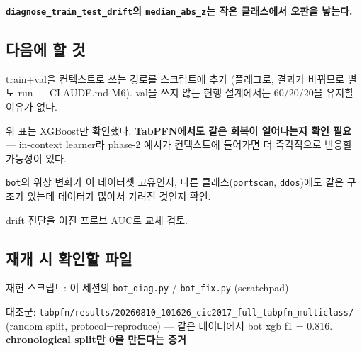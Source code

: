 \par\noindent \textbullet\enspace \textbf{\texttt{diagnose\allowbreak{}\_\allowbreak{}\allowbreak{}train\_\allowbreak{}\allowbreak{}t\allowbreak{}est\_\allowbreak{}\allowbreak{}drif\allowbreak{}t}의 \texttt{median\_\allowbreak{}\allowbreak{}a\allowbreak{}bs\_\allowbreak{}\allowbreak{}z}는 작은 클래스에서 오판을 낳는다.}


\subsection{다음에 할 것}
\par\noindent \textbullet\enspace [ ] train+\allowbreak{}val을 컨텍스트로 쓰는 경로를 스크립트에 추가 (플래그로, 결과가 바뀌므로 별도 run — CLAUDE.md M6). val을 쓰지 않는 현행 설계에서는 60/\allowbreak{}20/\allowbreak{}20을 유지할 이유가 없다.


\par\noindent \textbullet\enspace [ ] 위 표는 XGBoost만 확인했다. \textbf{TabPFN에서도 같은 회복이 일어나는지 확인 필요} — in-context learner라 phase-2 예시가 컨텍스트에 들어가면 더 즉각적으로 반응할 가능성이 있다.


\par\noindent \textbullet\enspace [ ] \texttt{bot}의 위상 변화가 이 데이터셋 고유인지, 다른 클래스(\texttt{portscan\allowbreak{}}, \texttt{ddos})에도 같은 구조가 있는데 데이터가 많아서 가려진 것인지 확인.


\par\noindent \textbullet\enspace [ ] drift 진단을 이진 프로브 AUC로 교체 검토.


\subsection{재개 시 확인할 파일}
\par\noindent \textbullet\enspace 재현 스크립트: 이 세션의 \texttt{bot\_\allowbreak{}\allowbreak{}diag\allowbreak{}.\allowbreak{}py} /\allowbreak{} \texttt{bot\_\allowbreak{}\allowbreak{}fix.\allowbreak{}py} (scratchpad)


\par\noindent \textbullet\enspace 대조군: \texttt{tabpfn/\allowbreak{}\allowbreak{}r\allowbreak{}esults/\allowbreak{}\allowbreak{}2\allowbreak{}0260810\_\allowbreak{}\allowbreak{}101626\_\allowbreak{}\allowbreak{}c\allowbreak{}ic2017\_\allowbreak{}\allowbreak{}f\allowbreak{}ull\_\allowbreak{}\allowbreak{}tabp\allowbreak{}fn\_\allowbreak{}\allowbreak{}multi\allowbreak{}class/\allowbreak{}\allowbreak{}} (random split, protocol=\allowbreak{}reproduce) — 같은 데이터에서 bot xgb f1 =\allowbreak{} 0.816. \textbf{chronological split만 0을 만든다는 증거}


